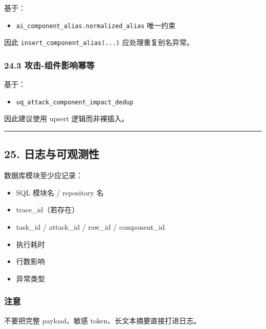 \documentclass[UTF8]{ctexart}
\providecommand{\tightlist}{%
  \setlength{\itemsep}{0pt}\setlength{\parskip}{0pt}}
\begin{document}
基于：

\begin{itemize}
\tightlist
\item
  \texttt{ai\_component\_alias.normalized\_alias} 唯一约束
\end{itemize}

因此 \texttt{insert\_component\_alias(...)} 应处理重复别名异常。

\hypertarget{ux653bux51fb-ux7ec4ux4ef6ux5f71ux54cdux5e42ux7b49}{%
\subsubsection{24.3
攻击-组件影响幂等}\label{ux653bux51fb-ux7ec4ux4ef6ux5f71ux54cdux5e42ux7b49}}

基于：

\begin{itemize}
\tightlist
\item
  \texttt{uq\_attack\_component\_impact\_dedup}
\end{itemize}

因此建议使用 upsert 逻辑而非裸插入。

\begin{center}\rule{0.5\linewidth}{0.5pt}\end{center}

\hypertarget{ux65e5ux5fd7ux4e0eux53efux89c2ux6d4bux6027}{%
\subsection{25.
日志与可观测性}\label{ux65e5ux5fd7ux4e0eux53efux89c2ux6d4bux6027}}

数据库模块至少应记录：

\begin{itemize}
\tightlist
\item
  SQL 模块名 / repository 名
\item
  trace\_id（若存在）
\item
  task\_id / attack\_id / raw\_id / component\_id
\item
  执行耗时
\item
  行数影响
\item
  异常类型
\end{itemize}

\hypertarget{ux6ce8ux610f}{%
\subsubsection{注意}\label{ux6ce8ux610f}}

不要把完整 payload、敏感 token、长文本摘要直接打进日志。
\end{document}
